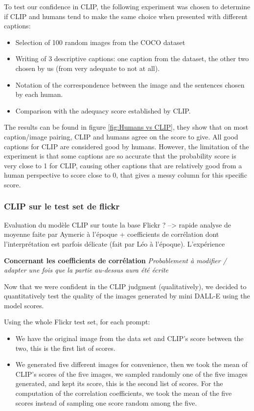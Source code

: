 \documentclass{article}
\begin{document}
To test our confidence in CLIP, the following experiment was chosen to determine if CLIP and humans tend to make the same choice when presented with different captions: 
\begin{itemize}
  \item Selection of 100 random images from the COCO dataset
  \item Writing of 3 descriptive captions: one caption from the dataset, the other two chosen by us (from very adequate to not at all).
  \item Notation of the correspondence between the image and the sentences chosen by each human.
  \item Comparison with the adequacy score established by CLIP.
\end{itemize}

The results can be found in figure \ref{fig:Humans vs CLIP}, they show that on most caption/image pairing, CLIP and humans agree on the score to give. All good captions for CLIP are considered good by humans. However, the limitation of the experiment is that some captions are so accurate that the probability score is very close to 1 for CLIP, causing other captions that are relatively good from a human perspective to score close to 0, that gives a messy column for this specific score.

\subsubsection{CLIP sur le test set de flickr}
Evaluation du modèle CLIP sur toute la base Flickr ? --> rapide analyse de moyenne faite par Aymeric à l'époque + coefficients de corrélation dont l'interprétation est parfois délicate (fait par Léo à l'époque). L'expérience 

\textbf{Concernant les coefficients de corrélation}
\textit{Probablement à modifier / adapter une fois que la partie au-dessus aura été écrite}

Now that we were confident in the CLIP judgment (qualitatively), we decided to quantitatively test the quality of the images generated by mini DALL-E using the model scores. 

Using the whole Flickr test set, for each prompt: 

\begin{itemize}
    \item We have the original image from the data set and CLIP's score between the two, this is the first list of scores.
    \item We generated five different images for convenience, then we took the mean of CLIP's scores of the five images, we sampled randomly one of the five images generated, and kept its score, this is the second list of scores. For the computation of the correlation coefficients, we took the mean of the five scores instead of sampling one score random among the five. 
\end{itemize}
\end{document}
